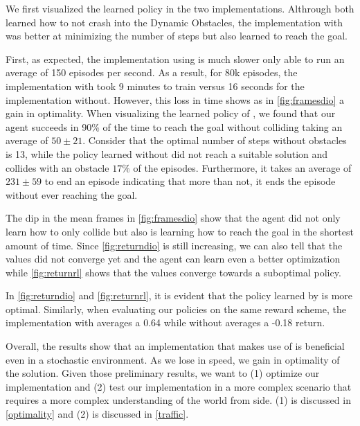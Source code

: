     We first visualized the learned policy in the two implementations. Althrough both learned 
    how to not crash into the Dynamic Obstacles, the implementation with \dio{} was better at minimizing the number of steps 
    but also learned to reach the goal. 

    First, as expected, the implementation using \dio{} is much slower only able to run 
    an average of 150 episodes per second. As a result, for 80k episodes, the implementation with \dio{} 
    took 9 minutes to train versus 16 seconds for the implementation without. However, this loss in time shows as in \ref{fig:framesdio} 
    a gain in optimality. When visualizing the learned policy of \dio{}, we found that our agent succeeds in 90\% 
    of the time to reach the goal without colliding taking an average of $50 \pm 21$. Consider that 
    the optimal number of steps without obstacles is 13, while the policy learned without \dio{} did not reach a suitable solution and collides with an obstacle $17\%$ of the episodes. Furthermore, it takes an average of $231 \pm 59$ to end an episode 
    indicating that more than not, it ends the episode without ever reaching the goal. 


    The dip in the mean frames in \ref{fig:framesdio} show that the agent did not only learn 
    how to only collide but also is learning how to reach the goal in the shortest amount of time. 
    Since \ref{fig:returndio} is still increasing, we can also tell that the values did not converge yet and 
    the agent can learn even a better optimization while \ref{fig:returnrl} shows that the values converge towards
    a suboptimal policy.


    In \ref{fig:returndio} and \ref{fig:returnrl}, it is evident that the policy learned by \dio{} 
    is more optimal. Similarly, when evaluating our policies on the same reward scheme, 
    the implementation with \dio{} averages a 0.64 while without \dio{} averages a -0.18 return.

    Overall, the results show that an implementation that makes use of
    \dio{} is beneficial even in a stochastic environment. As we lose in speed, we gain in optimality of the solution. 
    Given those preliminary results, we want to (1) optimize our implementation 
    and (2) test our implementation in a more complex scenario that requires a more complex understanding of the world 
    from \dio{} side. (1) is discussed in \ref{optimality} and (2) is discussed in \ref{traffic}. 

    
